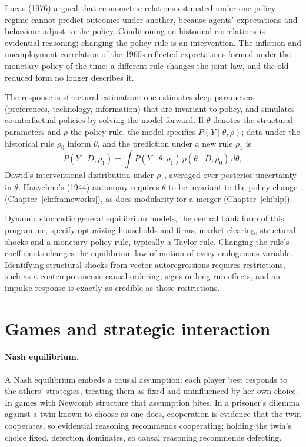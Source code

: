 Lucas (1976) argued that econometric relations estimated under one policy regime cannot predict outcomes under another, because agents' expectations and behaviour adjust to the policy. Conditioning on historical correlations is evidential reasoning; changing the policy rule is an intervention. The inflation and unemployment correlation of the 1960s reflected expectations formed under the monetary policy of the time; a different rule changes the joint law, and the old reduced form no longer describes it.

The response is structural estimation: one estimates deep parameters (preferences, technology, information) that are invariant to policy, and simulates counterfactual policies by solving the model forward. If $\theta$ denotes the structural parameters and $\rho$ the policy rule, the model specifies $P(Y\mid\theta,\rho)$; data under the historical rule $\rho_0$ inform $\theta$, and the prediction under a new rule $\rho_1$ is
\[
P(Y\mid D,\rho_1) = \int P(Y\mid\theta,\rho_1)\,p(\theta\mid D,\rho_0)\,d\theta ,
\]
Dawid's interventional distribution under $\rho_1$, averaged over posterior uncertainty in $\theta$. Haavelmo's (1944) autonomy requires $\theta$ to be invariant to the policy change (Chapter~\ref{ch:frameworks}), as does modularity for a merger (Chapter~\ref{ch:blp}).

Dynamic stochastic general equilibrium models, the central bank form of this programme, specify optimizing households and firms, market clearing, structural shocks and a monetary policy rule, typically a Taylor rule. Changing the rule's coefficients changes the equilibrium law of motion of every endogenous variable. Identifying structural shocks from vector autoregressions requires restrictions, such as a contemporaneous causal ordering, signs or long run effects, and an impulse response is exactly as credible as those restrictions.

\section{Games and strategic interaction}\label{cdt:sec:games}

\paragraph{Nash equilibrium.} A Nash equilibrium embeds a causal assumption: each player best responds to the others' strategies, treating them as fixed and uninfluenced by her own choice. In games with Newcomb structure that assumption bites. In a prisoner's dilemma against a twin known to choose as one does, cooperation is evidence that the twin cooperates, so evidential reasoning recommends cooperating; holding the twin's choice fixed, defection dominates, so causal reasoning recommends defecting. 

